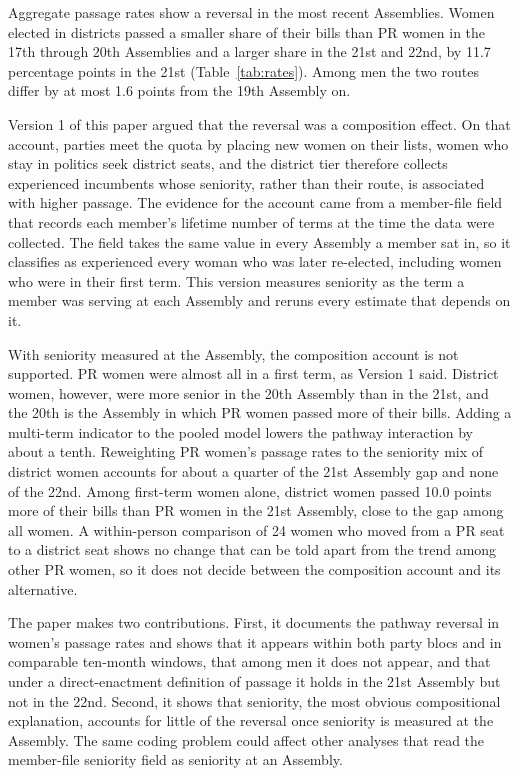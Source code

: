\documentclass[11pt]{article}
\begin{document}
Aggregate passage rates show a reversal in the most recent Assemblies. Women elected in districts passed a smaller share of their bills than PR women in the 17th through 20th Assemblies and a larger share in the 21st and 22nd, by 11.7 percentage points in the 21st (Table~\ref{tab:rates}). Among men the two routes differ by at most 1.6 points from the 19th Assembly on.

Version 1 of this paper argued that the reversal was a composition effect. On that account, parties meet the quota by placing new women on their lists, women who stay in politics seek district seats, and the district tier therefore collects experienced incumbents whose seniority, rather than their route, is associated with higher passage. The evidence for the account came from a member-file field that records each member's lifetime number of terms at the time the data were collected. The field takes the same value in every Assembly a member sat in, so it classifies as experienced every woman who was later re-elected, including women who were in their first term. This version measures seniority as the term a member was serving at each Assembly and reruns every estimate that depends on it.

With seniority measured at the Assembly, the composition account is not supported. PR women were almost all in a first term, as Version 1 said. District women, however, were more senior in the 20th Assembly than in the 21st, and the 20th is the Assembly in which PR women passed more of their bills. Adding a multi-term indicator to the pooled model lowers the pathway interaction by about a tenth. Reweighting PR women's passage rates to the seniority mix of district women accounts for about a quarter of the 21st Assembly gap and none of the 22nd. Among first-term women alone, district women passed 10.0 points more of their bills than PR women in the 21st Assembly, close to the gap among all women. A within-person comparison of 24 women who moved from a PR seat to a district seat shows no change that can be told apart from the trend among other PR women, so it does not decide between the composition account and its alternative.

The paper makes two contributions. First, it documents the pathway reversal in women's passage rates and shows that it appears within both party blocs and in comparable ten-month windows, that among men it does not appear, and that under a direct-enactment definition of passage it holds in the 21st Assembly but not in the 22nd. Second, it shows that seniority, the most obvious compositional explanation, accounts for little of the reversal once seniority is measured at the Assembly. The same coding problem could affect other analyses that read the member-file seniority field as seniority at an Assembly.
\end{document}
